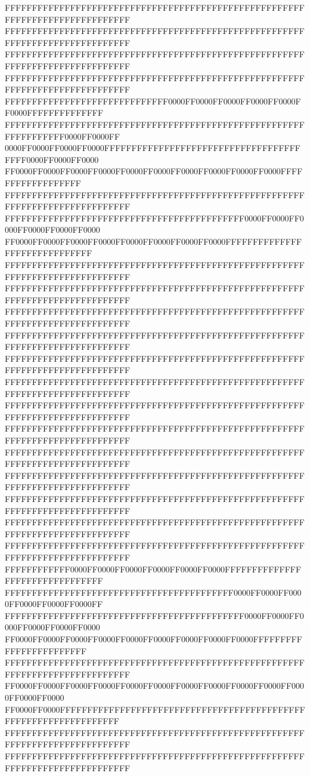 FFFFFFFFFFFFFFFFFFFFFFFFFFFFFFFFFFFFFFFFFFFFFFFFFFFFFFFFFFFFFFFFFFFFFFFFFFFFFF
FFFFFFFFFFFFFFFFFFFFFFFFFFFFFFFFFFFFFFFFFFFFFFFFFFFFFFFFFFFFFFFFFFFFFFFFFFFFFF
FFFFFFFFFFFFFFFFFFFFFFFFFFFFFFFFFFFFFFFFFFFFFFFFFFFFFFFFFFFFFFFFFFFFFFFFFFFFFF
FFFFFFFFFFFFFFFFFFFFFFFFFFFFFFFFFFFFFFFFFFFFFFFFFFFFFFFFFFFFFFFFFFFFFFFFFFFFFF
FFFFFFFFFFFFFFFFFFFFFFFFFFFFFF0000FF0000FF0000FF0000FF0000FF0000FFFFFFFFFFFFFF
FFFFFFFFFFFFFFFFFFFFFFFFFFFFFFFFFFFFFFFFFFFFFFFFFFFFFFFFFFFFFFFFFF0000FF0000FF
0000FF0000FF0000FF0000FFFFFFFFFFFFFFFFFFFFFFFFFFFFFFFFFFFFFFFF0000FF0000FF0000
FF0000FF0000FF0000FF0000FF0000FF0000FF0000FF0000FF0000FF0000FFFFFFFFFFFFFFFFFF
FFFFFFFFFFFFFFFFFFFFFFFFFFFFFFFFFFFFFFFFFFFFFFFFFFFFFFFFFFFFFFFFFFFFFFFFFFFFFF
FFFFFFFFFFFFFFFFFFFFFFFFFFFFFFFFFFFFFFFFFFFF0000FF0000FF0000FF0000FF0000FF0000
FF0000FF0000FF0000FF0000FF0000FF0000FF0000FF0000FFFFFFFFFFFFFFFFFFFFFFFFFFFFFF
FFFFFFFFFFFFFFFFFFFFFFFFFFFFFFFFFFFFFFFFFFFFFFFFFFFFFFFFFFFFFFFFFFFFFFFFFFFFFF
FFFFFFFFFFFFFFFFFFFFFFFFFFFFFFFFFFFFFFFFFFFFFFFFFFFFFFFFFFFFFFFFFFFFFFFFFFFFFF
FFFFFFFFFFFFFFFFFFFFFFFFFFFFFFFFFFFFFFFFFFFFFFFFFFFFFFFFFFFFFFFFFFFFFFFFFFFFFF
FFFFFFFFFFFFFFFFFFFFFFFFFFFFFFFFFFFFFFFFFFFFFFFFFFFFFFFFFFFFFFFFFFFFFFFFFFFFFF
FFFFFFFFFFFFFFFFFFFFFFFFFFFFFFFFFFFFFFFFFFFFFFFFFFFFFFFFFFFFFFFFFFFFFFFFFFFFFF
FFFFFFFFFFFFFFFFFFFFFFFFFFFFFFFFFFFFFFFFFFFFFFFFFFFFFFFFFFFFFFFFFFFFFFFFFFFFFF
FFFFFFFFFFFFFFFFFFFFFFFFFFFFFFFFFFFFFFFFFFFFFFFFFFFFFFFFFFFFFFFFFFFFFFFFFFFFFF
FFFFFFFFFFFFFFFFFFFFFFFFFFFFFFFFFFFFFFFFFFFFFFFFFFFFFFFFFFFFFFFFFFFFFFFFFFFFFF
FFFFFFFFFFFFFFFFFFFFFFFFFFFFFFFFFFFFFFFFFFFFFFFFFFFFFFFFFFFFFFFFFFFFFFFFFFFFFF
FFFFFFFFFFFFFFFFFFFFFFFFFFFFFFFFFFFFFFFFFFFFFFFFFFFFFFFFFFFFFFFFFFFFFFFFFFFFFF
FFFFFFFFFFFFFFFFFFFFFFFFFFFFFFFFFFFFFFFFFFFFFFFFFFFFFFFFFFFFFFFFFFFFFFFFFFFFFF
FFFFFFFFFFFFFFFFFFFFFFFFFFFFFFFFFFFFFFFFFFFFFFFFFFFFFFFFFFFFFFFFFFFFFFFFFFFFFF
FFFFFFFFFFFFFFFFFFFFFFFFFFFFFFFFFFFFFFFFFFFFFFFFFFFFFFFFFFFFFFFFFFFFFFFFFFFFFF
FFFFFFFFFFFF0000FF0000FF0000FF0000FF0000FF0000FFFFFFFFFFFFFFFFFFFFFFFFFFFFFFFF
FFFFFFFFFFFFFFFFFFFFFFFFFFFFFFFFFFFFFFFFFF0000FF0000FF0000FF0000FF0000FF0000FF
FFFFFFFFFFFFFFFFFFFFFFFFFFFFFFFFFFFFFFFFFFFF0000FF0000FF0000FF0000FF0000FF0000
FF0000FF0000FF0000FF0000FF0000FF0000FF0000FF0000FF0000FFFFFFFFFFFFFFFFFFFFFFFF
FFFFFFFFFFFFFFFFFFFFFFFFFFFFFFFFFFFFFFFFFFFFFFFFFFFFFFFFFFFFFFFFFFFFFFFFFFFFFF
FF0000FF0000FF0000FF0000FF0000FF0000FF0000FF0000FF0000FF0000FF0000FF0000FF0000
FF0000FF0000FFFFFFFFFFFFFFFFFFFFFFFFFFFFFFFFFFFFFFFFFFFFFFFFFFFFFFFFFFFFFFFFFF
FFFFFFFFFFFFFFFFFFFFFFFFFFFFFFFFFFFFFFFFFFFFFFFFFFFFFFFFFFFFFFFFFFFFFFFFFFFFFF
FFFFFFFFFFFFFFFFFFFFFFFFFFFFFFFFFFFFFFFFFFFFFFFFFFFFFFFFFFFFFFFFFFFFFFFFFFFFFF
